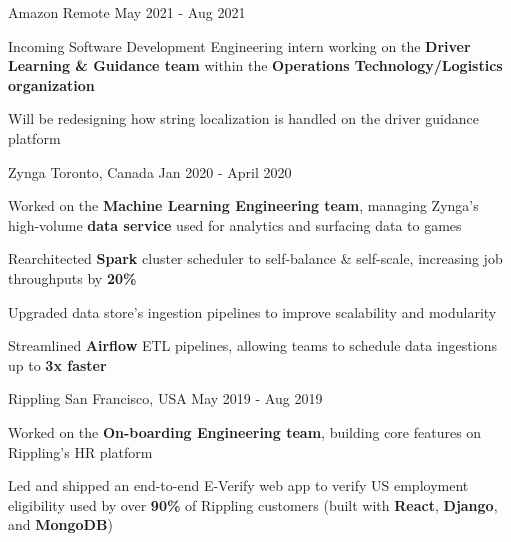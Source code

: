 \documentclass[11pt, a4paper]{awesome-cv}
\begin{document}
\makecvheader





\begin{siderules1}
\begin{cventries}
    \cventry
    {\textit{}}
    {Amazon}
    {Remote}
    {May 2021 - Aug 2021}
    {
      \begin{cvitems}
        \item {Incoming Software Development Engineering intern working on the \textbf{Driver Learning \& Guidance team} within the \textbf{Operations Technology/Logistics organization}}
        \item {Will be redesigning how string localization is handled on the driver guidance platform}
      \end{cvitems}
    }
    \cventry
    {\textit{}}
    {Zynga}
    {Toronto, Canada}
    {Jan 2020 - April 2020}
    {
      \begin{cvitems}
        \item {Worked on the \textbf{Machine Learning Engineering team}, managing Zynga's high-volume \textbf{data service} used for analytics and surfacing data to games}
        \item {Rearchitected \textbf{Spark} cluster scheduler to self-balance \& self-scale, increasing job throughputs by \textbf{20\%}}
        \item {Upgraded data store’s ingestion pipelines to improve scalability and modularity}
        \item {Streamlined \textbf{Airflow} ETL pipelines, allowing teams to schedule data ingestions up to \textbf{3x faster}}
      \end{cvitems}
    }
    \cventry
    {\textit{}}
    {Rippling}
    {San Francisco, USA}
    {May 2019 - Aug 2019}
    {
      \begin{cvitems}
        \item {Worked on the \textbf{On-boarding Engineering team}, building core features on Rippling's HR platform}
        \item {Led and shipped an end-to-end E-Verify web app to verify US employment eligibility used by over \textbf{90\%} of Rippling customers (built with \textbf{React}, \textbf{Django}, and \textbf{MongoDB})}

\end{cvitems}}
\end{cventries}
\end{siderules1}
\end{document}
